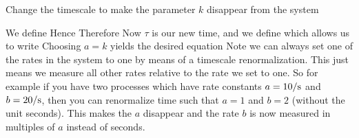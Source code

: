 Change the timescale to make the parameter $k$ disappear from the system


\solution 
We define 
Hence
Therefore
Now $\tau$ is our new time, and we define
which allows us to write
Choosing $a=k$ yields the desired equation
Note we can always set one of the rates in the system to one by means of a timescale renormalization. This just means we measure all other rates relative to the rate we set to one. So for example if you have two processes which have rate constants $a= 10/{\rm s}$ and $b= 20/{\rm s}$, then you can renormalize time such that $a=1$ and $b=2$ (without the unit seconds). This makes the $a$ disappear and the rate $b$ is now measured in multiples of $a$ instead of seconds.
